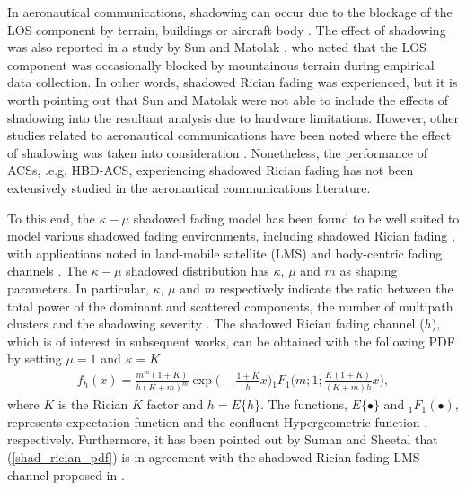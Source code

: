 In aeronautical communications, shadowing can occur due to the blockage of the LOS component by terrain, buildings or aircraft body \cite{matolak2012air,matolak2015unmanned,sun2017air_shadowing}. The effect of shadowing was also reported in a study by Sun and Matolak \cite{sun2017air_hilly}, who noted that the LOS component was occasionally blocked by mountainous terrain during empirical data collection. In other words, shadowed Rician fading was experienced, but it is worth pointing out that Sun and Matolak \cite{sun2017air_hilly} were not able to include the effects of shadowing into the resultant analysis due to hardware limitations. However, other studies related to aeronautical communications have been noted where the effect of shadowing was taken into consideration \cite{feng2006path,khatun2017millimeter,pokkunuru2017capacity,al2014optimal}. Nonetheless, the performance of ACSs, .e.g, HBD-ACS, experiencing shadowed Rician fading has not been extensively studied in the aeronautical communications literature. 

To this end, the $\kappa-\mu$ shadowed fading model has been found to be well suited to model various shadowed fading environments, including shadowed Rician fading \cite{paris2014statistical,moreno2016kappa,chun2017comprehensive,kumar2017outage}, with applications noted in land-mobile satellite (LMS) \cite{moreno2016kappa,chun2017comprehensive} and body-centric fading channels \cite{moreno2016kappa,chun2017comprehensive,cotton2015human}. The $\kappa-\mu$ shadowed distribution has $\kappa$, $\mu$ and $m$ as shaping parameters. In particular, $\kappa$, $\mu$ and $m$ respectively indicate the ratio between the total power of the dominant and scattered components, the number of multipath clusters and the shadowing severity \cite{chun2017comprehensive}. The shadowed Rician fading channel ($h$), which is of interest in subsequent works, can be obtained with the following PDF by setting $\mu=1$ and $\kappa = K$ \cite[Table I]{chun2017comprehensive} 
\begin{eqnarray}  \label{shad_rician_pdf}
f_h(x) = \frac{m^m(1+K)}{\overline{h}(K+m)^m} \exp\Bigg(-\frac{1+K}{\overline{h}}x\Bigg) {}_1{F_1}\Bigg(m;1;\frac{K(1+K)}{(K+m)\overline{h}}x\Bigg),
\end{eqnarray}
where $K$ is the Rician $K$ factor and $\overline{h} = E\{h\}$. The functions, $E\{\bullet\}$ and ${}_1{F_1}(\bullet)$, represents expectation function and the confluent Hypergeometric function \cite{gradshteyn2014table}, respectively. Furthermore, it has been pointed out by Suman and Sheetal \cite{kumar2017outage} that (\ref{shad_rician_pdf}) is in agreement with the shadowed Rician fading LMS channel proposed in \cite[eq. (6)]{abdi2003new}.

